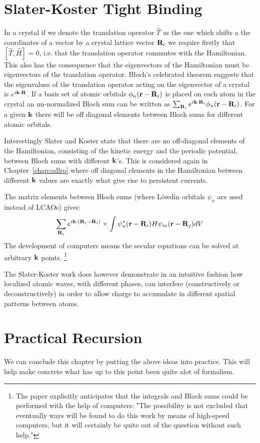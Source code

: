 \section{Slater-Koster Tight Binding}
  In a crystal if we denote the translation operator $\hat{T}$
as the one which shifts a the coordinates of a vector by a crystal lattice vector 
${\bf R}_{i}$ we require firstly that $[\hat{T},\hat{H}]=0$, i.e. that the 
translation operator commutes with the Hamiltonian. This also
has the consequence that the eigenvectors of the Hamiltonian
must be eigenvectors of the translation operator. Bloch's 
celebrated theorem suggests that the eigenvalues of the 
translation operator acting on the eigenvector of a crystal is $e^{i{\bf k}\cdot{\bf R}}$.
If a basis set of atomic orbitals $\phi_{n}({\bf r}-{\bf R}_{i})$
is placed on each atom in the crystal an un-normalized Bloch sum can be 
written as $\sum_{{\bf R}_{i}} e^{i{\bf k}\cdot{\bf R}_{i}}\phi_{n}({\bf r}-{\bf R}_{i})$. For
a given ${\bf k}$ there will be off diagonal elements between Bloch sums
for different atomic orbitals.

  Interestingly Slater and Koster state that there are no off-diagonal
elements of the Hamiltonian, consisting of the kinetic energy and the periodic potential, 
between Bloch sums with different ${\bf k}$'s. This is considered again in Chapter~\ref{chap:odlro}
where off diagonal elements in the Hamiltonian between different ${\bf k}$ values are exactly what give
rise to persistent currents.

The matrix elements between Bloch sums (where L\"owdin orbitals $\psi_{n}$ are used instead of LCAOs) gives:
%
\begin{equation}
\sum_{{\bf R}_{j}} e^{i{\bf k}\cdot({\bf R}_{j}-{\bf R}_{i})}\times\int \psi^{*}_{n}({\bf r}-{\bf R}_{i})H\psi_{m}({\bf r}-{\bf R}_{j})dV
\end{equation}
%
The development of computers means the secular equations can be solved 
at arbitrary ${\bf k}$ points. \footnote{The paper explicitly anticipates that the integrals and Bloch 
sums could be performed with the help of computers: "The possibility is not excluded 
that eventually ways will be found to do this work by means of high-speed computers, but
it will certainly be quite out of the question without such help."} 

The Slater-Koster work does however demonstrate in an intuitive fashion how localized atomic
waves, with different phases, can interfere (constructively or deconstructively) in order
to allow charge to accumulate in different spatial patterns between atoms.

\section{Practical Recursion}
We can conclude this chapter by putting the above ideas into practice.
This will help make concrete what has up to this point been quite alot of
formalism.

